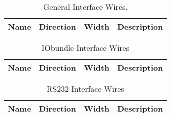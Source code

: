%

\begin{table}[H]
  \centering
  \begin{tabular}{|l|l|r|p{10.5cm}|}

    \hline
    \rowcolor{iob-green}
    {\bf Name} & {\bf Direction} & {\bf Width} & {\bf Description}  \\ \hline \hline

    

  \end{tabular}
  \caption{General Interface Wires.}
  \label{gen_if_tab:is}
\end{table}

\begin{table}[H]
  \centering
  \begin{tabular}{|l|l|r|p{8.5cm}|}

    \hline
    \rowcolor{iob-green}
    {\bf Name} & {\bf Direction} & {\bf Width} & {\bf Description}  \\ \hline \hline

    

  \end{tabular}
  \caption{IObundle Interface Wires}
  \label{tab:if_iob_s}
\end{table}

\begin{table}[H]
  \centering
  \begin{tabular}{|l|l|r|p{9.5cm}|}
    
    \hline
    \rowcolor{iob-green}
    {\bf Name} & {\bf Direction} & {\bf Width} & {\bf Description}  \\ \hline \hline

    
 
  \end{tabular}
  \caption{RS232 Interface Wires}
  \label{tab:if_rs232}
\end{table}

%
